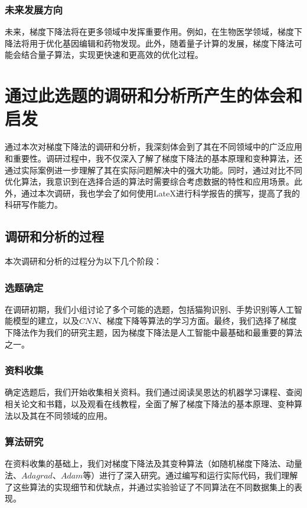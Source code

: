 \documentclass[printMode=true, declarePage=false]{ecnuthesis}
\begin{document}
    \subsection{未来发展方向}
    未来，梯度下降法将在更多领域中发挥重要作用。例如，在生物医学领域，梯度下降法将用于优化基因编辑和药物发现。此外，随着量子计算的发展，梯度下降法可能会结合量子算法，实现更快速和更高效的优化过程。

    \chapter{通过此选题的调研和分析所产生的体会和启发}

    通过本次对梯度下降法的调研和分析，我深刻体会到了其在不同领域中的广泛应用和重要性。调研过程中，我不仅深入了解了梯度下降法的基本原理和变种算法，还通过实际案例进一步理解了其在实际问题解决中的强大功能。同时，通过对比不同优化算法，我意识到在选择合适的算法时需要综合考虑数据的特性和应用场景。此外，通过本次调研，我也学会了如何使用LateX进行科学报告的撰写，提高了我的科研写作能力。


    \section{调研和分析的过程}
    本次调研和分析的过程分为以下几个阶段：

    \subsection{选题确定}
    在调研初期，我们小组讨论了多个可能的选题，包括猫狗识别、手势识别等人工智能模型的建立，以及$CNN$、梯度下降等算法的学习方面。最终，我们选择了梯度下降法作为我们的研究主题，因为梯度下降法是人工智能中最基础和最重要的算法之一。

    \subsection{资料收集}
    确定选题后，我们开始收集相关资料。我们通过阅读吴恩达的机器学习课程、查阅相关论文和书籍，以及观看在线教程，全面了解了梯度下降法的基本原理、变种算法以及其在不同领域的应用。

    \subsection{算法研究}
    在资料收集的基础上，我们对梯度下降法及其变种算法（如随机梯度下降法、动量法、$Adagrad$、$Adam$等）进行了深入研究。通过编写和运行实际代码，我们理解了这些算法的实现细节和优缺点，并通过实验验证了不同算法在不同数据集上的表现。
\end{document}

